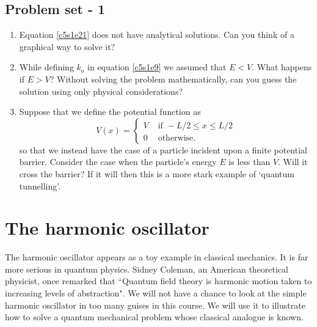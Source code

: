 \subsection{Problem set - 1}
\begin{enumerate}
\item Equation \eqref{c5s1e21} does not have analytical solutions. Can you 
think of a graphical way to solve it?
\item While defining $k_o$ in equation \eqref{c5s1e9} we assumed that $E<V$.
What happens if $E > V$? Without solving the problem mathematically, can you
guess the solution using only physical considerations?
\item Suppose that we define the potential function as
\begin{equation}
V(x) = \begin{cases}
V & \text{ if } -L/2 \le x \le L/2 \\
0 & \text{ otherwise.}
\end{cases}
\end{equation}
so that we instead have the case of a particle incident upon a finite potential
barrier. Consider the case when the particle's energy $E$ is less than $V$.
Will it cross the barrier? If it will then this is a more stark example of
`quantum tunnelling'.
\end{enumerate}

\section{The harmonic oscillator}\label{c5s2}
The harmonic oscillator appears as a toy example in classical mechanics. It is
far more serious in quantum physics. Sidney Coleman, an American theoretical
physicist, once remarked that ``Quantum field theory is harmonic motion taken
to increasing levels of abstraction". We will not have a chance to look at the
simple harmonic oscillator in too many guises in this course. We will use it
to illustrate how to solve a quantum mechanical problem whose classical analogue
is known.

